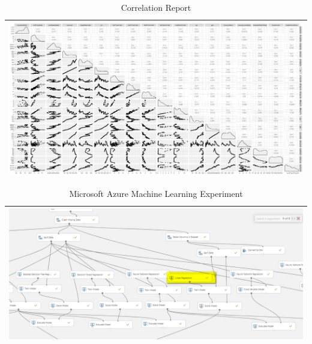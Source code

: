 \documentclass[sigconf,nonacm,11pt]{acmart}
\begin{document}
\begin{appendix}
\begin{table}[ht]
\caption{Correlation Report}
\centering
\begin{tabular}{p{1.0\linewidth}}
\hline
\includegraphics[scale = 0.27]{teamfedcorrelation.png}\\
\hline
\end{tabular}
\end{table}


\begin{table}[ht]
\caption{Microsoft Azure Machine Learning Experiment}
\centering
\begin{tabular}{p{1.0\linewidth}}
\hline
\includegraphics[scale = 0.46]{teamfed_azure_ml.png}\\
\hline
\end{tabular}
\end{table}


\end{appendix}


\end{document}
